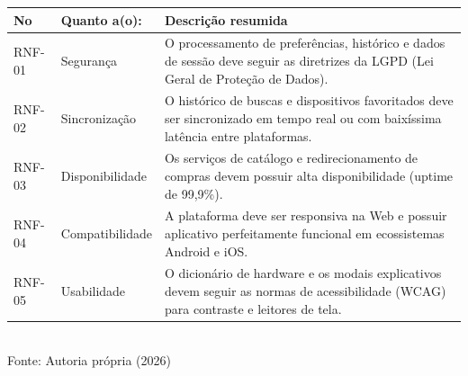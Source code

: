 \begin{quadro}[!htbp]
\centering
\caption{Requisitos não funcionais}
	\begin{tabular}{ | m{1.7cm} | m{4cm}| m{9cm} | }
		\hline
		\cellcolor{gray!20}\textbf{No} & \cellcolor{gray!20}\textbf{Quanto a(o):} & \cellcolor{gray!20}\textbf{Descrição resumida} \\ \hline
        RNF-01 & Segurança & O processamento de preferências, histórico e dados de sessão deve seguir as diretrizes da LGPD (Lei Geral de Proteção de Dados).\\ \hline
        RNF-02 & Sincronização & O histórico de buscas e dispositivos favoritados deve ser sincronizado em tempo real ou com baixíssima latência entre plataformas.\\ \hline
        RNF-03 & Disponibilidade & Os serviços de catálogo e redirecionamento de compras devem possuir alta disponibilidade (uptime de 99,9\%).\\ \hline
        RNF-04 & Compatibilidade & A plataforma deve ser responsiva na Web e possuir aplicativo perfeitamente funcional em ecossistemas Android e iOS.\\ \hline
        RNF-05 & Usabilidade & O dicionário de hardware e os modais explicativos devem seguir as normas de acessibilidade (WCAG) para contraste e leitores de tela.\\ \hline
	\end{tabular}
	\\ \vspace{0.2cm}
	Fonte: Autoria própria (2026)
	\label{tab:reqnaofunc1}
\end{quadro}
